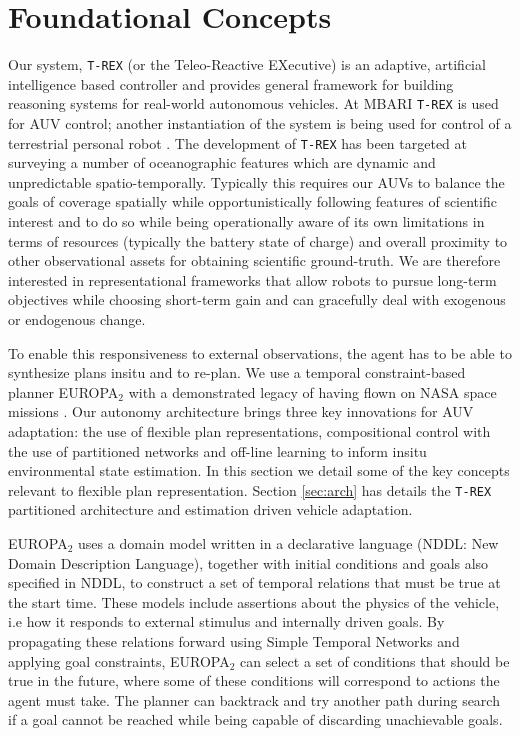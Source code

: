 \section{Foundational Concepts}
\label{sec:concepts}

Our system, \texttt{T-REX} (or the Teleo-Reactive EXecutive) is an
adaptive, artificial intelligence based controller and provides
general framework for building reasoning systems for real-world
autonomous vehicles. At MBARI \texttt{T-REX} is used for AUV control;
another instantiation of the system is being used for control of a
terrestrial personal robot \cite{pr2, Meeussen:2010dn}. The development of
\texttt{T-REX} has been targeted at surveying a number of
oceanographic features which are dynamic and unpredictable
spatio-temporally. Typically this requires our AUVs to balance the
goals of coverage spatially while opportunistically following features
of scientific interest and to do so while being operationally aware of
its own limitations in terms of resources (typically the battery state
of charge) and overall proximity to other observational assets for
obtaining scientific ground-truth. We are therefore interested in
representational frameworks that allow robots to pursue long-term
objectives while choosing short-term gain and can gracefully deal with
exogenous or endogenous change.

To enable this responsiveness to external observations, the agent has
to be able to synthesize plans insitu and to re-plan. We use a
temporal constraint-based planner EUROPA$_2$ with a demonstrated
legacy of having flown on NASA space missions
\cite{jonsson00,bresina05}. Our autonomy architecture brings three key
innovations for AUV adaptation: the use of flexible plan
representations, compositional control with the use of partitioned
networks and off-line learning to inform insitu environmental state
estimation. In this section we detail some of the key concepts
relevant to flexible plan representation. Section \ref{sec:arch} has
details the \texttt{T-REX} partitioned architecture and estimation
driven vehicle adaptation.

EUROPA$_2$ uses a domain model written in a declarative language
(NDDL: New Domain Description Language), together with initial
conditions and goals also specified in NDDL, to construct a set of
temporal relations that must be true at the start time. These models
include assertions about the physics of the vehicle, i.e how it
responds to external stimulus and internally driven goals. By
propagating these relations forward using Simple Temporal Networks
\cite{dechter91} and applying goal constraints, EUROPA$_2$ can select
a set of conditions that should be true in the future, where some of
these conditions will correspond to actions the agent must take. The
planner can backtrack and try another path during search if a goal
cannot be reached while being capable of discarding unachievable
goals.

